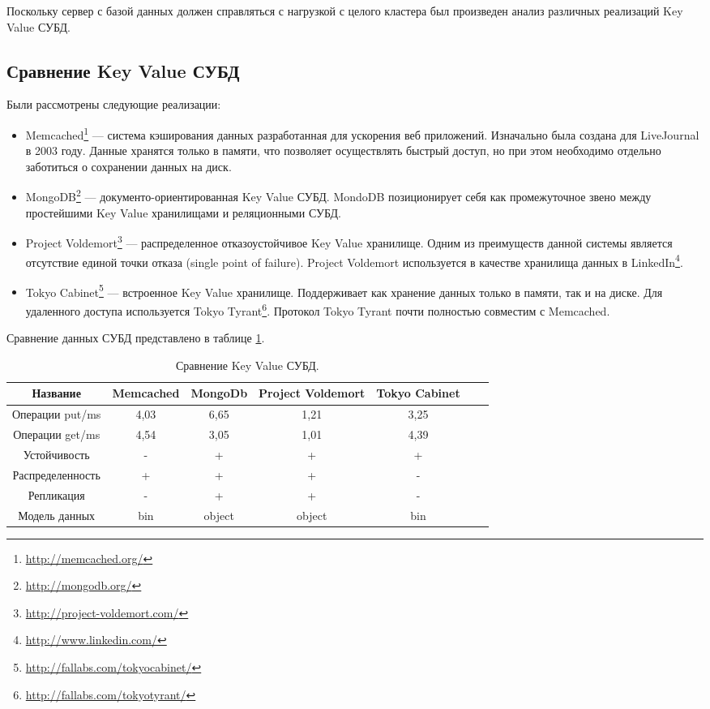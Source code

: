Поскольку сервер с базой данных должен справляться с нагрузкой с целого кластера был произведен анализ различных реализаций Key Value СУБД.
\subsection{Сравнение Key Value СУБД}
Были рассмотрены следующие реализации:
\begin{itemize}
 \item Memcached\footnote{\href{http://memcached.org/}{http://memcached.org/}} --- система кэширования данных разработанная для ускорения веб приложений. Изначально была создана для LiveJournal в 2003 году. Данные хранятся только в памяти, что позволяет осуществлять быстрый доступ, но при этом необходимо отдельно заботиться о сохранении данных на диск.
 \item MongoDB\footnote{\href{http://mongodb.org/}{http://mongodb.org/}} --- документо-ориентированная Key Value СУБД. MondoDB позиционирует себя как промежуточное звено между простейшими Key Value хранилищами и реляционными СУБД.
 \item Project Voldemort\footnote{\href{http://project-voldemort.com/}{http://project-voldemort.com/}} --- распределенное отказоустойчивое Key Value хранилище. Одним из преимуществ данной системы является отсутствие единой точки отказа (single point of failure). Project Voldemort используется в качестве хранилища данных в LinkedIn\footnote{\href{http://www.linkedin.com/}{http://www.linkedin.com/}}.
 \item Tokyo Cabinet\footnote{\href{http://fallabs.com/tokyocabinet/}{http://fallabs.com/tokyocabinet/}} --- встроенное Key Value хранилище. Поддерживает как хранение данных только в памяти, так и на диске. Для удаленного доступа используется Tokyo Tyrant\footnote{\href{http://fallabs.com/tokyotyrant/}{http://fallabs.com/tokyotyrant/}}. Протокол Tokyo Tyrant почти полностью совместим с Memcached.
\end{itemize}

Сравнение данных СУБД представлено в таблице \ref{tab:kv}.

\begin{table}[h]
\caption{\label{tab:kv}Сравнение Key Value СУБД.}
\begin{center}
\begin{tabular}{|c|c|c|c|c|c|c|}
\hline
Название & Memcached & MongoDb & Project Voldemort & Tokyo Cabinet\\
\hline
Операции put/ms & 4,03 & 6,65 & 1,21 & 3,25 \\
\hline
Операции get/ms & 4,54 & 3,05 & 1,01 & 4,39 \\
\hline
Устойчивость & - & + & + & + \\
\hline
Распределенность & + & + & + & - \\
\hline
Репликация & - & + & + & - \\
\hline
Модель данных & bin & object & object & bin\\
\hline
\end{tabular}
\end{center}
\end{table}

